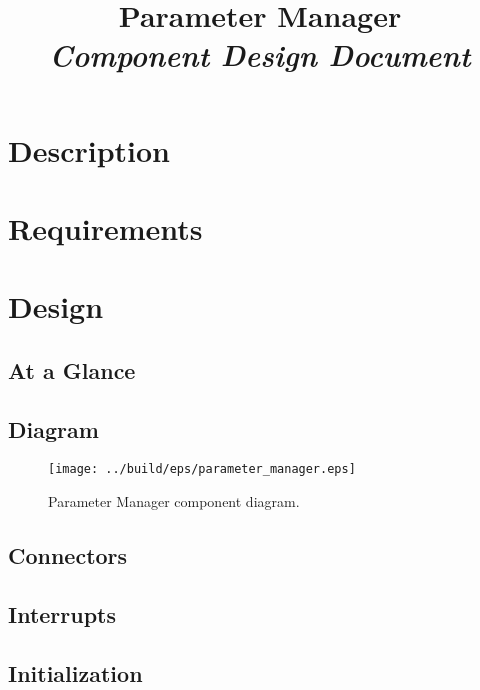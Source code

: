 



\title{\textbf{Parameter Manager} \\
\large\textit{Component Design Document}}
\date{}
\maketitle

\section{Description}


\section{Requirements}


\section{Design}

\subsection{At a Glance}


\subsection{Diagram}
\begin{figure}[H]
  \texttt{[image: ../build/eps/parameter\_manager.eps]}
  \caption{Parameter Manager component diagram.}
\end{figure}

\subsection{Connectors}


\subsection{Interrupts}



\subsection{Initialization}


